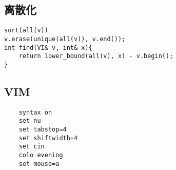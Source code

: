 \documentclass[twocolumn,a4]{article}
\begin{document}
\subsection{离散化}
\begin{lstlisting}
sort(all(v))
v.erase(unique(all(v)), v.end());
int find(VI& v, int& x){
    return lower_bound(all(v), x) - v.begin();
}
\end{lstlisting}

\subsection{VIM}
\begin{lstlisting}
    syntax on
    set nu
    set tabstop=4
    set shiftwidth=4
    set cin
    colo evening
    set mouse=a
\end{lstlisting}

\end{document}
